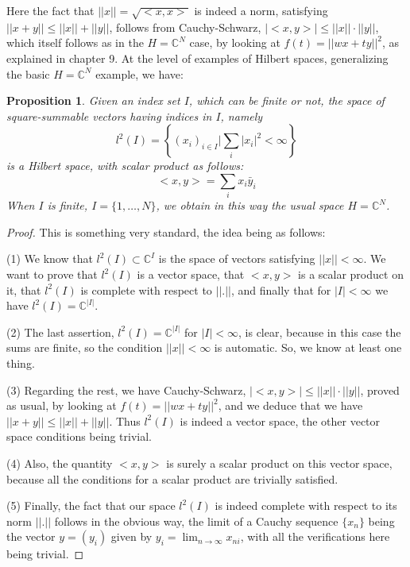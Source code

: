 \documentclass[12pt]{amsbook}
\newtheorem{proposition}[theorem]{Proposition}
\begin{document}
Here the fact that $||x||=\sqrt{<x,x>}$ is indeed a norm, satisfying $||x+y||\leq||x||+||y||$, follows from Cauchy-Schwarz, $|\!<x,y>\!|\leq||x||\cdot||y||$, which itself follows as in the $H=\mathbb C^N$ case, by looking at $f(t)=||wx+ty||^2$, as explained in chapter 9. At the level of examples of Hilbert spaces, generalizing the basic $H=\mathbb C^N$ example, we have:


\begin{proposition}
Given an index set $I$, which can be finite or not, the space of square-summable vectors having indices in $I$, namely
$$l^2(I)=\left\{(x_i)_{i\in I}\Big|\sum_i|x_i|^2<\infty\right\}$$
is a Hilbert space, with scalar product as follows:
$$<x,y>=\sum_ix_i\bar{y}_i$$
When $I$ is finite, $I=\{1,\ldots,N\}$, we obtain in this way the usual space $H=\mathbb C^N$.
\end{proposition}

\begin{proof}
This is something very standard, the idea being as follows:

\medskip

(1) We know that $l^2(I)\subset\mathbb C^I$ is the space of vectors satisfying $||x||<\infty$. We want to prove that $l^2(I)$ is a vector space, that $<x,y>$ is a scalar product on it, that $l^2(I)$ is complete with respect to $||.||$, and finally that for $|I|<\infty$ we have $l^2(I)=\mathbb C^{|I|}$.

\medskip

(2) The last assertion, $l^2(I)=\mathbb C^{|I|}$ for $|I|<\infty$, is clear, because in this case the sums are finite, so the condition $||x||<\infty$ is automatic. So, we know at least one thing.

\medskip

(3) Regarding the rest, we have Cauchy-Schwarz, $|<x,y>|\leq||x||\cdot||y||$, proved as usual, by looking at $f(t)=||wx+ty||^2$, and we deduce that we have $||x+y||\leq||x||+||y||$. Thus $l^2(I)$ is indeed a vector space, the other vector space conditions being trivial.

\medskip

(4) Also, the quantity $<x,y>$ is surely a scalar product on this vector space, because all the conditions for a scalar product are trivially satisfied.

\medskip

(5) Finally, the fact that our space $l^2(I)$ is indeed complete with respect to its norm $||.||$ follows in the obvious way, the limit of a Cauchy sequence $\{x_n\}$ being the vector $y=(y_i)$ given by $y_i=\lim_{n\to\infty}x_{ni}$, with all the verifications here being trivial.
\end{proof}
\end{document}
